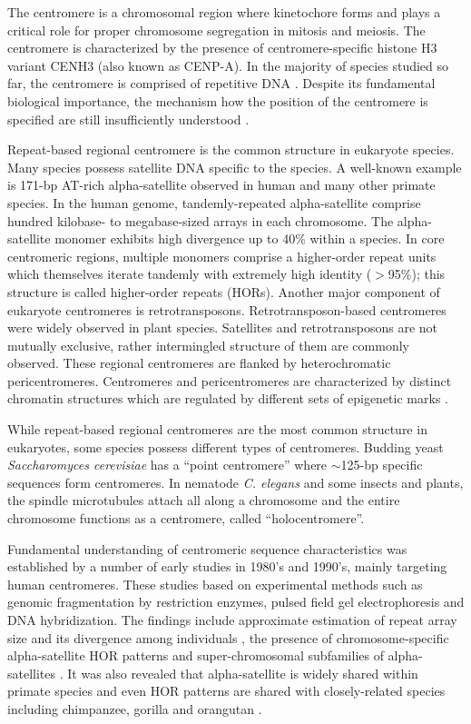 The centromere is a chromosomal region where kinetochore forms and plays a critical role for proper chromosome segregation in mitosis and meiosis. The centromere is characterized by the presence of centromere-specific histone H3 variant CENH3 (also known as CENP-A). In the majority of species studied so far, the centromere is comprised of repetitive DNA \cite{Plohl2014}. Despite its fundamental biological importance, the mechanism how the position of the centromere is specified are still insufficiently understood \cite{McKinley2016}.

Repeat-based regional centromere is the common structure in eukaryote species. Many species possess satellite DNA specific to the species. A well-known example is 171-bp AT-rich alpha-satellite observed in human and many other primate species. In the human genome, tandemly-repeated alpha-satellite comprise hundred kilobase- to megabase-sized arrays in each chromosome. The alpha-satellite monomer exhibits high divergence up to 40\% within a species. In core centromeric regions, multiple monomers comprise a higher-order repeat units which themselves iterate tandemly with extremely high identity ($>$95\%); this structure is called higher-order repeats (HORs). Another major component of eukaryote centromeres is retrotransposons. Retrotransposon-based centromeres were widely observed in plant species. Satellites and retrotransposons are not mutually exclusive, rather intermingled structure of them are commonly observed. These regional centromeres are flanked by heterochromatic pericentromeres. Centromeres and pericentromeres are characterized by distinct chromatin structures which are regulated by different sets of epigenetic marks \cite{}.

While repeat-based regional centromeres are the most common structure in eukaryotes, some species possess different types of centromeres. Budding yeast \textit{Saccharomyces cerevisiae} has a ``point centromere'' where $\sim$125-bp specific sequences form centromeres. In nematode \textit{C. elegans} and some insects and plants, the spindle microtubules attach all along a chromosome and the entire chromosome functions as a centromere, called ``holocentromere''.


Fundamental understanding of centromeric sequence characteristics was established by a number of early studies in 1980's and 1990's, mainly targeting human centromeres. These studies based on experimental methods such as genomic fragmentation by restriction enzymes, pulsed field gel electrophoresis and DNA hybridization. The findings include approximate estimation of repeat array size and its divergence among individuals \cite{Oakey1990}, the presence of chromosome-specific alpha-satellite HOR patterns \cite{Willard1987} and super-chromosomal subfamilies of alpha-satellites \cite{Alexandrov2001}. It was also revealed that alpha-satellite is widely shared within primate species and even HOR patterns are shared with closely-related species including chimpanzee, gorilla and orangutan \cite{Willard1991}.

